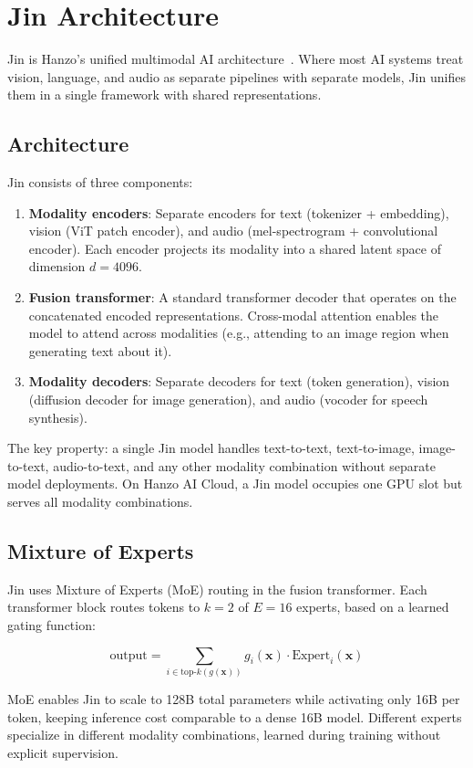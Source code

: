 \section{Jin Architecture}

\label{sec:jin}

Jin is Hanzo's unified multimodal AI architecture~\cite{hanzojin}. Where most
AI systems treat vision, language, and audio as separate pipelines with
separate models, Jin unifies them in a single framework with shared
representations.

\subsection{Architecture}

Jin consists of three components:

\begin{enumerate}[leftmargin=1.4em]
    \item \textbf{Modality encoders}: Separate encoders for text (tokenizer +
    embedding), vision (ViT patch encoder), and audio (mel-spectrogram +
    convolutional encoder). Each encoder projects its modality into a shared
    latent space of dimension $d = 4096$.
    \item \textbf{Fusion transformer}: A standard transformer decoder that
    operates on the concatenated encoded representations. Cross-modal
    attention enables the model to attend across modalities (e.g., attending
    to an image region when generating text about it).
    \item \textbf{Modality decoders}: Separate decoders for text (token
    generation), vision (diffusion decoder for image generation), and audio
    (vocoder for speech synthesis).
\end{enumerate}

The key property: a single Jin model handles text-to-text, text-to-image,
image-to-text, audio-to-text, and any other modality combination without
separate model deployments. On Hanzo AI Cloud, a Jin model occupies one GPU
slot but serves all modality combinations.

\subsection{Mixture of Experts}

Jin uses Mixture of Experts (MoE) routing in the fusion transformer. Each
transformer block routes tokens to $k = 2$ of $E = 16$ experts, based on a
learned gating function:

\begin{equation}
\text{output} = \sum_{i \in \text{top-}k(g(\bm{x}))} g_i(\bm{x}) \cdot
\text{Expert}_i(\bm{x})
\end{equation}

MoE enables Jin to scale to 128B total parameters while activating only 16B
per token, keeping inference cost comparable to a dense 16B model. Different
experts specialize in different modality combinations, learned during training
without explicit supervision.

